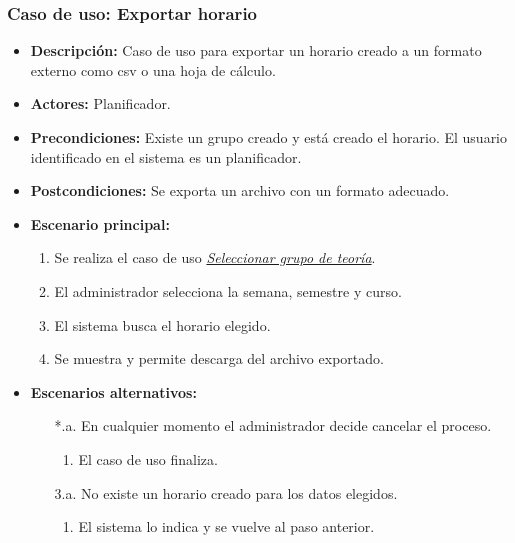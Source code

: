 \subsubsection*{Caso de uso: Exportar horario}
\begin{itemize}
\item{\bf Descripción:} Caso de uso para exportar un horario creado a un formato externo como csv o una hoja de cálculo.
\item{\bf Actores:} Planificador.
\item{\bf Precondiciones:} Existe un grupo creado y está creado el horario. El usuario identificado en el sistema es un planificador.
\item{\bf Postcondiciones:} Se exporta un archivo con un formato adecuado.
\item{\bf Escenario principal:}
	\begin{enumerate}
	\item Se realiza el caso de uso {\em \hyperref[select_grupo]{Seleccionar grupo de teoría}}.
	\item El administrador selecciona la semana, semestre y curso.
	\item El sistema busca el horario elegido.
	\item Se muestra y permite descarga del archivo exportado.
	\end{enumerate}
\item{\bf Escenarios alternativos:}
	\begin{itemize}
		\item[*.a.] En cualquier momento el administrador decide cancelar el proceso.
		\begin{enumerate}
			\item El caso de uso finaliza.
		\end{enumerate}
		\item[3.a.] No existe un horario creado para los datos elegidos.
		\begin{enumerate}
			\item El sistema lo indica y se vuelve al paso anterior.
		\end{enumerate}
	\end{itemize}
\end{itemize}


